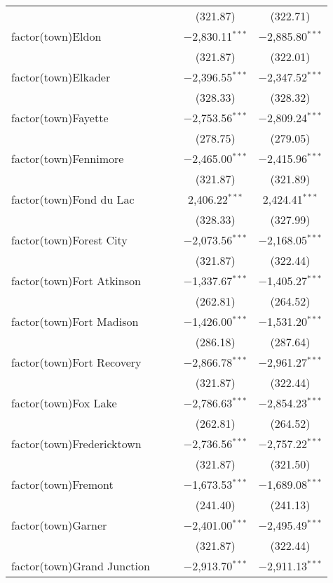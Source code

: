 \begin{table}[!htbp]
\begin{tabular}{@{\extracolsep{5pt}}lcccc}
  &  &  & (321.87) & (322.71) \\ 
  factor(town)Eldon &  &  & $-$2,830.11$^{***}$ & $-$2,885.80$^{***}$ \\ 
  &  &  & (321.87) & (322.01) \\ 
  factor(town)Elkader &  &  & $-$2,396.55$^{***}$ & $-$2,347.52$^{***}$ \\ 
  &  &  & (328.33) & (328.32) \\ 
  factor(town)Fayette &  &  & $-$2,753.56$^{***}$ & $-$2,809.24$^{***}$ \\ 
  &  &  & (278.75) & (279.05) \\ 
  factor(town)Fennimore &  &  & $-$2,465.00$^{***}$ & $-$2,415.96$^{***}$ \\ 
  &  &  & (321.87) & (321.89) \\ 
  factor(town)Fond du Lac &  &  & 2,406.22$^{***}$ & 2,424.41$^{***}$ \\ 
  &  &  & (328.33) & (327.99) \\ 
  factor(town)Forest City &  &  & $-$2,073.56$^{***}$ & $-$2,168.05$^{***}$ \\ 
  &  &  & (321.87) & (322.44) \\ 
  factor(town)Fort Atkinson &  &  & $-$1,337.67$^{***}$ & $-$1,405.27$^{***}$ \\ 
  &  &  & (262.81) & (264.52) \\ 
  factor(town)Fort Madison &  &  & $-$1,426.00$^{***}$ & $-$1,531.20$^{***}$ \\ 
  &  &  & (286.18) & (287.64) \\ 
  factor(town)Fort Recovery &  &  & $-$2,866.78$^{***}$ & $-$2,961.27$^{***}$ \\ 
  &  &  & (321.87) & (322.44) \\ 
  factor(town)Fox Lake &  &  & $-$2,786.63$^{***}$ & $-$2,854.23$^{***}$ \\ 
  &  &  & (262.81) & (264.52) \\ 
  factor(town)Fredericktown &  &  & $-$2,736.56$^{***}$ & $-$2,757.22$^{***}$ \\ 
  &  &  & (321.87) & (321.50) \\ 
  factor(town)Fremont &  &  & $-$1,673.53$^{***}$ & $-$1,689.08$^{***}$ \\ 
  &  &  & (241.40) & (241.13) \\ 
  factor(town)Garner &  &  & $-$2,401.00$^{***}$ & $-$2,495.49$^{***}$ \\ 
  &  &  & (321.87) & (322.44) \\ 
  factor(town)Grand Junction &  &  & $-$2,913.70$^{***}$ & $-$2,911.13$^{***}$ \\ 

\end{tabular}
\end{table}
